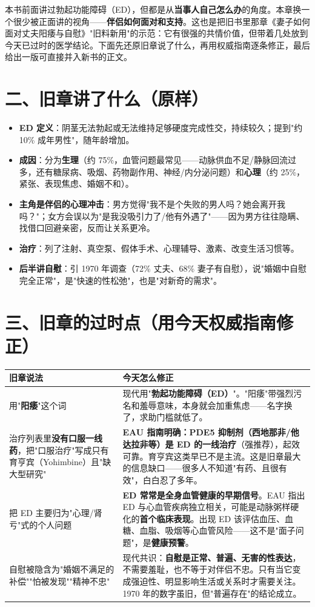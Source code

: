 本书前面讲过勃起功能障碍（ED），但都是从\textbf{当事人自己怎么办}的角度。本章换一个很少被正面讲的视角——\textbf{伴侣如何面对和支持}。这也是把旧书里那章《妻子如何面对丈夫阳痿与自慰》"旧料新用"的示范：它有很强的共情价值，但带着几处放到今天已过时的医学结论。下面先还原旧章说了什么，再用权威指南逐条修正，最后给出一版可直接并入新书的正文。

\section{二、旧章讲了什么（原样）}

\begin{itemize}
  \item \textbf{ED 定义}：阴茎无法勃起或无法维持足够硬度完成性交，持续较久；提到"约 10\% 成年男性"，随年龄增加。
  \item \textbf{成因}：分为\textbf{生理}（约 75\%，血管问题最常见——动脉供血不足/静脉回流过多，还有糖尿病、吸烟、药物副作用、神经/内分泌问题）和\textbf{心理}（约 25\%，紧张、表现焦虑、婚姻不和）。
  \item \textbf{主角是伴侣的心理冲击}：男方觉得"我不是个失败的男人吗？她会离开我吗？"；女方会误以为"是我没吸引力了/他有外遇了"——因为男方往往隐瞒、找借口回避亲密，反而让关系更冷。
  \item \textbf{治疗}：列了注射、真空泵、假体手术、心理辅导、激素、改变生活习惯等。
  \item \textbf{后半讲自慰}：引 1970 年调查（72\% 丈夫、68\% 妻子有自慰），说"婚姻中自慰完全正常"，是"快速的性松弛"，也是"对新奇的需求"。
\end{itemize}

\section{三、旧章的过时点（用今天权威指南修正）}

\begin{tabularx}{\textwidth}{lX}
\toprule
\textbf{旧章说法} & \textbf{今天怎么修正} \\
\midrule
用"\textbf{阳痿}"这个词 & 现代用"\textbf{勃起功能障碍（ED）}"。"阳痿"带强烈污名和羞辱意味，本身就会加重焦虑——名字换了，求助门槛就低了。 \\
治疗列表里\textbf{没有口服一线药}，把"口服治疗"写成只有育亨宾（Yohimbine）且"缺大型研究" & \textbf{EAU 指南明确：PDE5 抑制剂（西地那非/他达拉非等）是 ED 的一线治疗}（强推荐），起效可靠。育亨宾这类早已不是主流。这是旧章最大的信息缺口——很多人不知道"有药、且很有效"，白白忍了多年。 \\
把 ED 主要归为"心理/肾亏"式的个人问题 & \textbf{ED 常常是全身血管健康的早期信号}。EAU 指出 ED 与心血管疾病独立相关，可能是动脉粥样硬化的\textbf{首个临床表现}。出现 ED 该评估血压、血糖、血脂、吸烟等心血管风险——这不是"面子问题"，是\textbf{健康预警}。 \\
自慰被隐含为"婚姻不满足的补偿""怕被发现""精神不忠" & 现代共识：\textbf{自慰是正常、普遍、无害的性表达}，不需要羞耻，也不等于对伴侣不忠。只有当它变成强迫性、明显影响生活或关系时才需要关注。1970 年的数字虽旧，但"普遍存在"的结论成立。 \\
\bottomrule
\end{tabularx}

